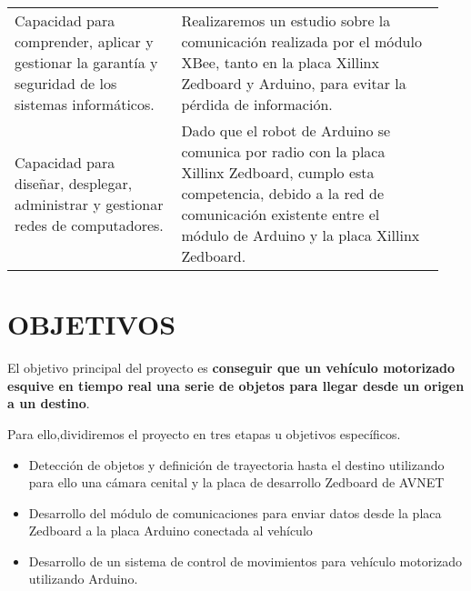 \documentclass{pre-tfg}
\begin{document}
\begin{table}[hp]
\begin{tabular}{p{0.36\linewidth}p{0.58\linewidth}}
    Capacidad para comprender, aplicar y gestionar la garantía y seguridad de los sistemas informáticos. & Realizaremos un estudio sobre la comunicación realizada por el módulo XBee, tanto en la placa Xillinx Zedboard y Arduino, para evitar la pérdida de información.\\
    Capacidad para diseñar, desplegar, administrar y gestionar redes de computadores. & Dado que el robot de Arduino se comunica por radio con la placa Xillinx Zedboard, cumplo esta competencia, debido a la red de comunicación existente entre el módulo de Arduino y la placa Xillinx Zedboard.\\
    \hline
  \end{tabular}
\end{table}


\section{OBJETIVOS}


El objetivo principal del proyecto es \textbf{conseguir que un vehículo motorizado esquive en tiempo real una serie de objetos para llegar desde un origen a un destino}. 

Para ello,dividiremos el proyecto en tres etapas u objetivos específicos.
\begin{itemize}
\item Detección de objetos y definición de trayectoria hasta el destino utilizando para ello una cámara cenital y la placa de desarrollo Zedboard de AVNET
\item Desarrollo del módulo de comunicaciones para enviar datos desde la placa Zedboard a la placa Arduino conectada al vehículo
\item Desarrollo de un sistema de control de movimientos para vehículo motorizado utilizando Arduino.
\end{itemize}
\end{document}
